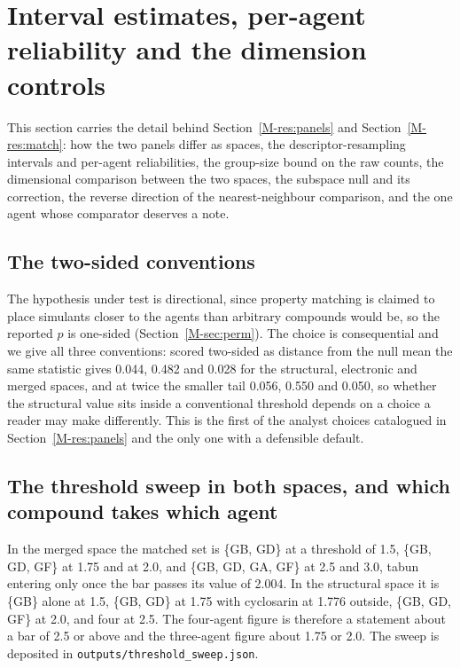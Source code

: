 \documentclass[11pt,a4paper]{article}
\begin{document}
\section{Interval estimates, per-agent reliability and the dimension controls}
\label{res:paneldetail}

This section carries the detail behind Section~\ref{M-res:panels} and
Section~\ref{M-res:match}: how the two panels differ as spaces, the
descriptor-resampling intervals and per-agent reliabilities, the group-size
bound on the raw counts, the dimensional comparison between the two spaces,
the subspace null and its correction, the reverse direction of the
nearest-neighbour comparison, and the one agent whose comparator deserves a
note.

\subsection{The two-sided conventions}

The hypothesis under test is directional, since property matching is claimed to
place simulants closer to the agents than arbitrary compounds would be, so the
reported $p$ is one-sided (Section~\ref{M-sec:perm}). The choice is
consequential and we give all three conventions: scored two-sided as distance
from the null mean the same statistic gives 0.044, 0.482 and 0.028 for the
structural, electronic and merged spaces, and at twice the smaller tail 0.056,
0.550 and 0.050, so whether the structural value sits inside a conventional
threshold depends on a choice a reader may make differently. This is the first
of the analyst choices catalogued in Section~\ref{M-res:panels} and the only one
with a defensible default.


\subsection{The threshold sweep in both spaces, and which compound takes which agent}

In the merged space the matched set is \{GB, GD\} at a threshold of 1.5,
\{GB, GD, GF\} at 1.75 and at 2.0, and \{GB, GD, GA, GF\} at 2.5 and 3.0,
tabun entering only once the bar passes its value of 2.004. In the structural
space it is \{GB\} alone at 1.5, \{GB, GD\} at 1.75 with cyclosarin at 1.776
outside, \{GB, GD, GF\} at 2.0, and four at 2.5. The four-agent figure is
therefore a statement about a bar of 2.5 or above and the three-agent figure
about 1.75 or 2.0. The sweep is deposited in
\texttt{outputs/threshold\_sweep.json}.
\end{document}

